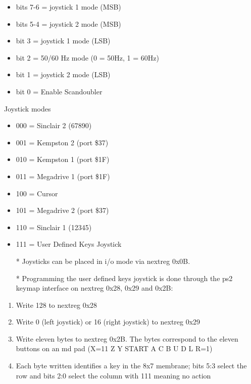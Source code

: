 \begin{itemize}
\item bits 7-6 = joystick 1 mode (MSB)
\item bits 5-4 = joystick 2 mode (MSB)
\item bit 3 = joystick 1 mode (LSB)
\item bit 2 = 50/60 Hz mode (0 = 50Hz, 1 = 60Hz)
\item bit 1 = joystick 2 mode (LSB)
\item bit 0 = Enable Scandoubler
\end{itemize}
Joystick modes
\begin{itemize}
\item 000 = Sinclair 2 (67890)
\item 001 = Kempston 2 (port \$37)
\item 010 = Kempston 1 (port \$1F)
\item 011 = Megadrive 1 (port \$1F)
\item 100 = Cursor
\item 101 = Megadrive 2 (port \$37)
\item 110 = Sinclair 1 (12345)
\item 111 = User Defined Keys Joystick
\end{itemize}
\begin{itemize}
\item[*] Joysticks can be placed in i/o mode via nextreg 0x0B.
\item[*] Programming the user defined keys joystick is done through the ps2
keymap interface on nextreg 0x28, 0x29 and 0x2B:
\end{itemize}
\begin{enumerate}
\item Write 128 to nextreg 0x28
\item Write 0 (left joystick) or 16 (right joystick) to nextreg 0x29
\item Write eleven bytes to nextreg 0x2B. The bytes correspond to the eleven
buttons on an md pad (X=11 Z Y START A C B U D L R=1)
\item Each byte written identifies a key in the 8x7 membrane; bits 5:3 select
the row and bits 2:0 select the column with 111 meaning no action
\end{enumerate}

